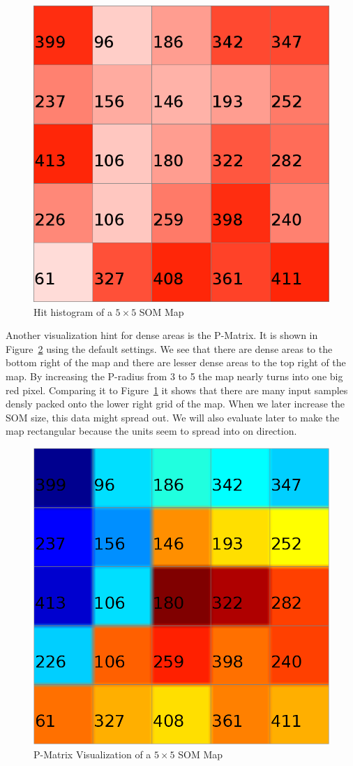 \documentclass{acm_proc_article-sp}
\begin{document}
\begin{figure}
\centering
\includegraphics[width=0.5\linewidth]{img/wine-small-hit-histogram}
\caption{Hit histogram of a $5\times5$ SOM Map}
\label{fig:wine-small-hit-histogram}
\end{figure}

Another visualization hint for dense areas is the P-Matrix. It is shown in Figure~\ref{fig:wine-small-p-matrix} using
the default settings. We see that there are dense areas to the bottom right of the map and there are lesser
dense areas to the top right of the map.
By increasing the P-radius from 3 to 5 the map nearly turns into one big red pixel.
Comparing it to Figure~\ref{fig:wine-small-hit-histogram} it shows that there are many input samples densly packed
onto the lower right grid of the map. When we later increase the SOM size, this data might spread out. We
will also evaluate later to make the map rectangular because the units seem to spread into on direction.

\begin{figure}
\centering
\includegraphics[width=0.5\linewidth]{img/wine-small-p-matrix}
\caption{P-Matrix Visualization of a $5\times5$ SOM Map}
\label{fig:wine-small-p-matrix}
\end{figure}
\end{document}
